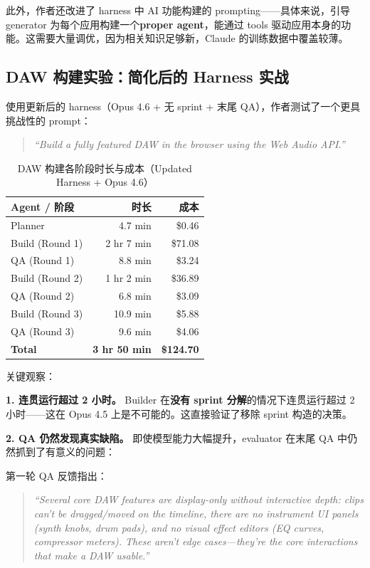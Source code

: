 此外，作者还改进了 harness 中 AI 功能构建的 prompting——具体来说，引导 generator 为每个应用构建一个\textbf{proper agent}，能通过 tools 驱动应用本身的功能。这需要大量调优，因为相关知识足够新，Claude 的训练数据中覆盖较薄。

\subsection{DAW 构建实验：简化后的 Harness 实战}

使用更新后的 harness（Opus 4.6 + 无 sprint + 末尾 QA），作者测试了一个更具挑战性的 prompt：

\begin{quote}
\textit{``Build a fully featured DAW in the browser using the Web Audio API.''}
\end{quote}

\begin{table}[H]
\centering
\renewcommand{\arraystretch}{1.3}
\begin{tabular}{lrr}
\toprule
\textbf{Agent / 阶段} & \textbf{时长} & \textbf{成本} \\
\midrule
Planner & 4.7 min & \$0.46 \\
Build (Round 1) & 2 hr 7 min & \$71.08 \\
QA (Round 1) & 8.8 min & \$3.24 \\
Build (Round 2) & 1 hr 2 min & \$36.89 \\
QA (Round 2) & 6.8 min & \$3.09 \\
Build (Round 3) & 10.9 min & \$5.88 \\
QA (Round 3) & 9.6 min & \$4.06 \\
\midrule
\textbf{Total} & \textbf{3 hr 50 min} & \textbf{\$124.70} \\
\bottomrule
\end{tabular}
\caption{DAW 构建各阶段时长与成本（Updated Harness + Opus 4.6）}
\end{table}

关键观察：

\textbf{1. 连贯运行超过 2 小时。} Builder 在\textbf{没有 sprint 分解}的情况下连贯运行超过 2 小时——这在 Opus 4.5 上是不可能的。这直接验证了移除 sprint 构造的决策。

\textbf{2. QA 仍然发现真实缺陷。} 即使模型能力大幅提升，evaluator 在末尾 QA 中仍然抓到了有意义的问题：

第一轮 QA 反馈指出：
\begin{quote}
\textit{``Several core DAW features are display-only without interactive depth: clips can't be dragged/moved on the timeline, there are no instrument UI panels (synth knobs, drum pads), and no visual effect editors (EQ curves, compressor meters). These aren't edge cases---they're the core interactions that make a DAW usable.''}
\end{quote}

